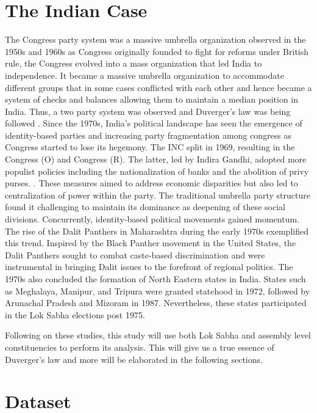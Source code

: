 \section{The Indian Case}
The Congress party system \citep{kothari1967india, candland1997congress} was a massive umbrella organization observed in the 1950s and 1960s as Congress originally founded to fight for reforms under British rule, the Congress evolved into a mass organization that led India to independence. It became a massive umbrella organization to accommodate different groups that in some cases conflicted with each other and hence became a system of checks and balances allowing them to maintain a median position in India. Thus, a two party system was observed and Duverger's law was being followed \citep{riker1982two}. Since the 1970s, India's political landscape has seen the emergence of identity-based parties and increasing party fragmentation among congress as Congress started to lose its hegemony. The INC  split in 1969, resulting in the Congress (O) and Congress (R). The latter, led by Indira Gandhi, adopted more populist policies including the nationalization of banks and the abolition of privy purses. \citep{Guha2011article}. These measures aimed to address economic disparities but also led to centralization of power within the party. The traditional umbrella party structure found it challenging to maintain its dominance as deepening of these social divisions. Concurrently, identity-based political movements gained momentum\citep{farooqui2016can}. The rise of the Dalit Panthers in Maharashtra during the early 1970s exemplified this trend. Inspired by the Black Panther movement in the United States, the Dalit Panthers sought to combat caste-based discrimination and were instrumental in bringing Dalit issues to the forefront of regional politics. The 1970s also concluded the formation of North Eastern states in India. States such as Meghalaya, Manipur, and Tripura were granted statehood in 1972, followed by Arunachal Pradesh and Mizoram in 1987.  Nevertheless, these states participated in the Lok Sabha elections post 1975.

\vspace{0.3cm}


Following on these studies, this study will use both Lok Sabha and assembly level constituencies to perform its analysis. This will give us a true essence of Duverger's law and more will be elaborated in the following sections.

\section{Dataset}

